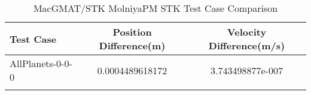 \begin{table}[htbp!]
\centering
\caption{ MacGMAT/STK MolniyaPM STK Test Case Comparison}
      \begin{tabular}{lcc}
      \hline\hline
          Test Case & Position Difference(m) & Velocity Difference(m/s) \\
         \hline
         AllPlanets-0-0-0 & 0.0004489618172 & 3.743498877e-007 \\
      \hline\hline
      \label{Table: MolniyaPM STK Table} 
\end{tabular}
\end{table}
